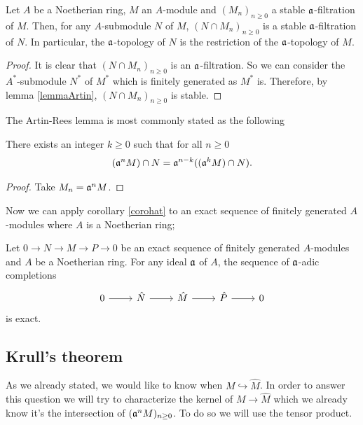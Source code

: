 \begin{prop}
    Let $A$ be a Noetherian ring, $M$ an $A$-module and $(M_n)_{n\geq0}$ a stable $\mathfrak{a}$-filtration of $M$. Then, for any $A$-submodule $N$ of $M$, $(N\cap M_n)_{n\geq 0}$ is a stable $\mathfrak{a}$-filtration of $N$. In particular, the $\mathfrak{a}$-topology of $N$ is the restriction of the $\mathfrak{a}$-topology of $M$.
\end{prop}
\begin{proof}
    It is clear that $(N\cap M_n)_{n\geq 0}$ is an $\mathfrak{a}$-filtration. So we can consider the $A^*$-submodule $N^*$ of $M^*$ which is finitely generated as $M^*$ is. Therefore, by lemma \ref{lemmaArtin}, $(N\cap M_n)_{n\geq 0}$ is stable.
\end{proof}

The Artin-Rees lemma is most commonly stated as the following 
\begin{coro}
    There exists an integer $k\geq 0$ such that for all $n\geq 0$
    \[
    (\mathfrak{a}^nM)\cap N=\mathfrak{a}^{n-k}((\mathfrak{a}^kM)\cap N).
    \]
\end{coro}
\begin{proof}
    Take $M_n=\mathfrak{a}^nM$.
\end{proof}

Now we can apply corollary \ref{corohat} to an exact sequence of finitely generated $A$-modules where $A$ is a Noetherian ring;
\begin{prop}\label{exactseqofmod}
    Let $0\to N \to M \to P\to 0$ be an exact sequence of finitely generated $A$-modules and $A$ be a Noetherian ring. For any ideal $\mathfrak{a}$ of $A$, the sequence of $\mathfrak{a}$-adic completions
    \[
    \begin{tikzcd}
        0 \rar & \hat N\rar & \hat M\rar & \hat P\rar & 0
    \end{tikzcd}
    \]
    is exact.
\end{prop}

\subsection{Krull's theorem}

As we already stated, we would like to know when $M\hookrightarrow \hat M$. In order to answer this question we will try to characterize the kernel of $M\to \hat M$ which we already know it's the intersection of $(\mathfrak{a}^nM)_{n\geq 0}$. To do so we will use the tensor product.

